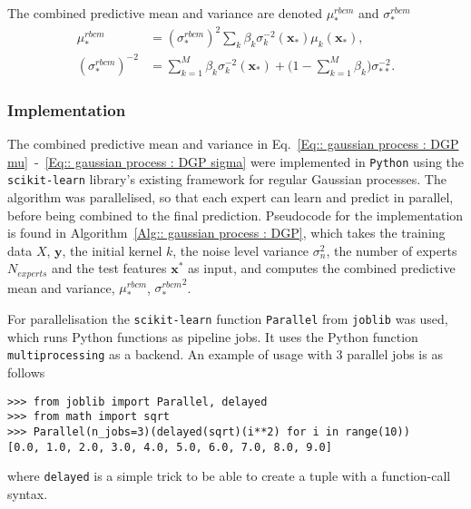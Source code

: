\documentclass[twoside,english]{uiofysmaster}
\begin{document}
The combined predictive mean and variance are denoted $\mu^{rbcm}_*$ and $\sigma_*^{rbcm}$
\begin{align}
\mu_*^{rbcm} &= (\sigma_*^{rbcm})^2 \sum_k \beta_k \sigma_k^{-2} (\textbf{x}_*) \mu_k (\textbf{x}_*),\label{Eq:: gaussian process : DGP mu} \\
(\sigma_*^{rbcm})^{-2} &= \sum_{k=1}^M \beta_k \sigma_k^{-2} (\textbf{x}_*) + \big(1 - \sum_{k=1}^M \beta_k \big) \sigma_{**}^{-2}.\label{Eq:: gaussian process : DGP sigma}
\end{align}


\subsubsection{Implementation}

The combined predictive mean and variance in Eq.~\ref{Eq:: gaussian process : DGP mu}~-~\ref{Eq:: gaussian process : DGP sigma} were implemented in \verb|Python| using the \verb|scikit-learn| library's existing framework for regular Gaussian processes. The algorithm was parallelised, so that each expert can learn and predict in parallel, before being combined to the final prediction. Pseudocode for the implementation is found in Algorithm~\ref{Alg:: gaussian process : DGP}, which takes the training data $X$, $\textbf{y}$, the initial kernel $k$, the noise level variance $\sigma_n^2$, the number of experts $N_{experts}$ and the test features $\textbf{x}^*$ as input, and computes the combined predictive mean and variance, $\mu^{rbcm}_*$, ${\sigma_*^{rbcm}}^2$.

For parallelisation the \verb|scikit-learn| function \verb|Parallel| from \verb|joblib| was used, which runs Python functions as pipeline jobs. It uses the Python function \verb|multiprocessing| as a backend. An example of usage with 3 parallel jobs is as follows
\begin{lstlisting}
>>> from joblib import Parallel, delayed
>>> from math import sqrt
>>> Parallel(n_jobs=3)(delayed(sqrt)(i**2) for i in range(10))
[0.0, 1.0, 2.0, 3.0, 4.0, 5.0, 6.0, 7.0, 8.0, 9.0]
\end{lstlisting}
where \verb|delayed| is a simple trick to be able to create a tuple with a function-call syntax.
\end{document}
